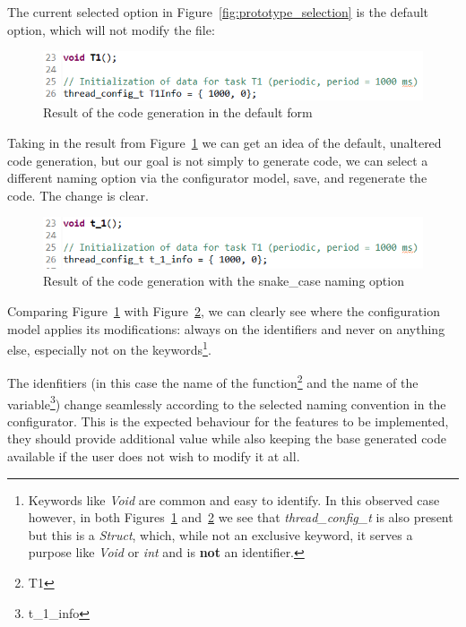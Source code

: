 The current selected option in Figure~\ref{fig:prototype_selection} is the default option, which will not modify the file:

\begin{figure}[htbp]
	\centering
	\includegraphics[height=0.12\textwidth]{default_naming_option.png}
	\caption{Result of the code generation in the default form}
	\label{fig:prototype_default_option}
\end{figure}

Taking in the result from Figure~\ref{fig:prototype_default_option} we can get an idea of the default, unaltered code generation, but our goal is not simply to generate code, we can select a different naming option via the configurator model, save, and regenerate the code. The change is clear.

\begin{figure}[htbp]
	\centering
	\includegraphics[height=0.12\textwidth]{snake_case_naming_option.png}
	\caption{Result of the code generation with the snake\_case naming option}
	\label{fig:prototype_snake_case}
\end{figure}

Comparing Figure~\ref{fig:prototype_default_option} with Figure~\ref{fig:prototype_snake_case}, we can clearly see where the configuration model applies its modifications: always on the identifiers and never on anything else, especially not on the keywords\footnote{Keywords like \textit{Void} are common and easy to identify. In this observed case however, in both Figures~\ref{fig:prototype_default_option} and~\ref{fig:prototype_snake_case} we see that \textit{thread\_config\_t} is also present but this is a \textit{Struct}, which, while not an exclusive keyword, it serves a purpose like \textit{Void} or \textit{int} and is \textbf{not} an identifier.}.

The idenfitiers (in this case the name of the function\footnote{T1} and the name of the variable\footnote{t\_1\_info}) change seamlessly according to the selected naming convention in the configurator. This is the expected behaviour for the features to be implemented, they should provide additional value while also keeping the base generated code available if the user does not wish to modify it at all. 

